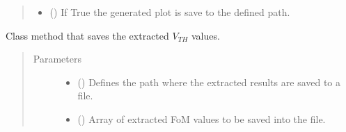 \documentclass[letterpaper,10pt,english,openany, oneside]{sphinxmanual}
\begin{document}
\begin{fulllineitems}
\begin{fulllineitems}
\begin{quote}
\begin{description}
\begin{itemize}
\item {} 
 () \textendash{} If True the generated plot is save to the defined path.

\end{itemize}

\end{description}\end{quote}

\end{fulllineitems}


\begin{fulllineitems}
\label{\detokenize{index:fompy.fom.ss_ext.save_results_to_file}}
Class method that saves the extracted \(V_{TH}\) values.
\begin{quote}\begin{description}
\item[{Parameters}] \leavevmode\begin{itemize}
\item {} 
 () \textendash{} Defines the path where the extracted results are saved to a file.

\item {} 
 () \textendash{} Array of extracted FoM values to be saved into the file.

\end{itemize}

\end{description}\end{quote}

\end{fulllineitems}


\end{fulllineitems}

\end{document}
